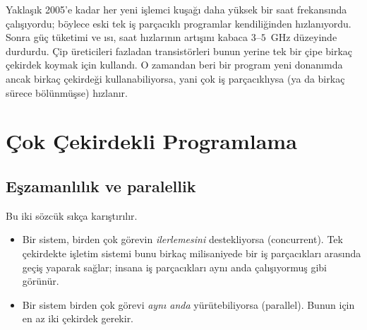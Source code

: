 \begin{histnote}
Yaklaşık 2005'e kadar her yeni işlemci kuşağı daha yüksek bir saat frekansında çalışıyordu; böylece eski tek iş parçacıklı programlar kendiliğinden hızlanıyordu. Sonra güç tüketimi ve ısı, saat hızlarının artışını kabaca $3$--$5$~GHz düzeyinde durdurdu. Çip üreticileri fazladan transistörleri bunun yerine tek bir çipe birkaç çekirdek koymak için kullandı. O zamandan beri bir program yeni donanımda ancak birkaç çekirdeği kullanabiliyorsa, yani çok iş parçacıklıysa (ya da birkaç sürece bölünmüşse) hızlanır.
\end{histnote}

\section{Çok Çekirdekli Programlama}

\subsection{Eşzamanlılık ve paralellik}

Bu iki sözcük sıkça karıştırılır.

\begin{itemize}
  \item Bir sistem, birden çok görevin \emph{ilerlemesini} destekliyorsa  (concurrent). Tek çekirdekte işletim sistemi bunu birkaç milisaniyede bir iş parçacıkları arasında geçiş yaparak sağlar; insana iş parçacıkları aynı anda çalışıyormuş gibi görünür.
  \item Bir sistem birden çok görevi \emph{aynı anda} yürütebiliyorsa  (parallel). Bunun için en az iki çekirdek gerekir.
\end{itemize}


